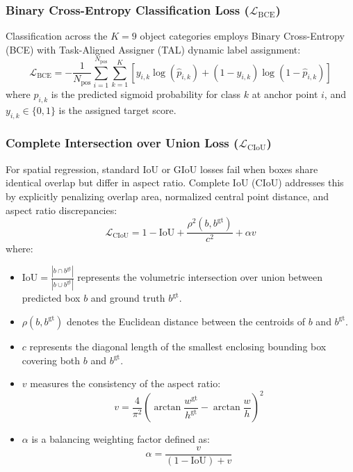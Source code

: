 \subsubsection{Binary Cross-Entropy Classification Loss ($\mathcal{L}_{\text{BCE}}$)}
Classification across the $K=9$ object categories employs Binary Cross-Entropy (BCE) with Task-Aligned Assigner (TAL) dynamic label assignment:
\begin{equation}
    \mathcal{L}_{\text{BCE}} = -\frac{1}{N_{\text{pos}}} \sum_{i=1}^{N_{\text{pos}}} \sum_{k=1}^K \left[ y_{i,k} \log(\hat{p}_{i,k}) + (1 - y_{i,k}) \log(1 - \hat{p}_{i,k}) \right]
\end{equation}
where $\hat{p}_{i,k}$ is the predicted sigmoid probability for class $k$ at anchor point $i$, and $y_{i,k} \in \{0, 1\}$ is the assigned target score.

\subsubsection{Complete Intersection over Union Loss ($\mathcal{L}_{\text{CIoU}}$)}
For spatial regression, standard IoU or GIoU losses fail when boxes share identical overlap but differ in aspect ratio. Complete IoU (CIoU) \cite{zheng2020distance} addresses this by explicitly penalizing overlap area, normalized central point distance, and aspect ratio discrepancies:
\begin{equation}
    \mathcal{L}_{\text{CIoU}} = 1 - \text{IoU} + \frac{\rho^2(b, b^{\text{gt}})}{c^2} + \alpha v
    \label{eq:ciou}
\end{equation}
where:
\begin{itemize}
    \item $\text{IoU} = \frac{|b \cap b^{\text{gt}}|}{|b \cup b^{\text{gt}}|}$ represents the volumetric intersection over union between predicted box $b$ and ground truth $b^{\text{gt}}$.
    \item $\rho(b, b^{\text{gt}})$ denotes the Euclidean distance between the centroids of $b$ and $b^{\text{gt}}$.
    \item $c$ represents the diagonal length of the smallest enclosing bounding box covering both $b$ and $b^{\text{gt}}$.
    \item $v$ measures the consistency of the aspect ratio:
    \begin{equation}
        v = \frac{4}{\pi^2} \left( \arctan\frac{w^{\text{gt}}}{h^{\text{gt}}} - \arctan\frac{w}{h} \right)^2
    \end{equation}
    \item $\alpha$ is a balancing weighting factor defined as:
    \begin{equation}
        \alpha = \frac{v}{(1 - \text{IoU}) + v}
    \end{equation}
\end{itemize}


